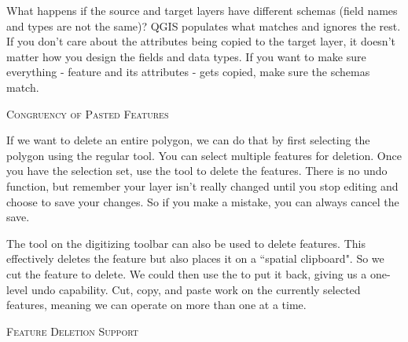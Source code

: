 What happens if the source and target layers have
different schemas (field names and types are not the same)? QGIS populates
what matches and ignores the rest. If you don't care about the attributes
being copied to the target layer, it doesn't matter how you design the
fields and data types. If you want to make sure everything - feature and its
attributes - gets copied, make sure the schemas match.

\begin{Tip}[ht]\caption{\textsc{Congruency of Pasted Features}}
\end{Tip}


If we want to delete an entire polygon, we can do that by first selecting 
the polygon using the regular  tool. You can select 
multiple features for deletion. Once you have the selection set, use the 
 tool to delete the features. There is no undo function, 
but remember your layer isn't really changed until you stop editing and choose 
to save your changes. So if you make a mistake, you can always cancel the save.

The  tool on the digitizing toolbar can
also be used to delete features. This effectively deletes the feature but
also places it on a ``spatial clipboard". So we cut the feature to delete. 
We could then use the  to put it back, giving us a one-level undo 
capability. Cut, copy, and paste work on the currently selected features, 
meaning we can operate on more than one at a time.

\begin{Tip}[ht]\caption{\textsc{Feature Deletion Support}}
\end{Tip}


